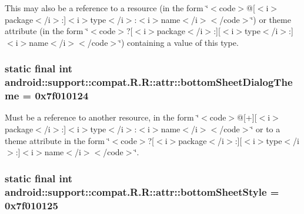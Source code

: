 This may also be a reference to a resource (in the form \char`\"{}$<$code$>$@\mbox{[}$<$i$>$package$<$/i$>$:\mbox{]}$<$i$>$type$<$/i$>$:$<$i$>$name$<$/i$>$$<$/code$>$\char`\"{}) or theme attribute (in the form \char`\"{}$<$code$>$?\mbox{[}$<$i$>$package$<$/i$>$:\mbox{]}\mbox{[}$<$i$>$type$<$/i$>$:\mbox{]}$<$i$>$name$<$/i$>$$<$/code$>$\char`\"{}) containing a value of this type. \hypertarget{classandroid_1_1support_1_1compat_1_1_r_1_1attr_8034aae0aadacf5d1f746a7eb33e7a3c}{
\subsubsection[{bottomSheetDialogTheme}]{\setlength{\rightskip}{0pt plus 5cm}static final int android::support::compat.R.R::attr::bottomSheetDialogTheme = 0x7f010124}}
\label{classandroid_1_1support_1_1compat_1_1_r_1_1attr_8034aae0aadacf5d1f746a7eb33e7a3c}


Must be a reference to another resource, in the form \char`\"{}$<$code$>$@\mbox{[}+\mbox{]}\mbox{[}$<$i$>$package$<$/i$>$:\mbox{]}$<$i$>$type$<$/i$>$:$<$i$>$name$<$/i$>$$<$/code$>$\char`\"{} or to a theme attribute in the form \char`\"{}$<$code$>$?\mbox{[}$<$i$>$package$<$/i$>$:\mbox{]}\mbox{[}$<$i$>$type$<$/i$>$:\mbox{]}$<$i$>$name$<$/i$>$$<$/code$>$\char`\"{}. \hypertarget{classandroid_1_1support_1_1compat_1_1_r_1_1attr_1f751f9457292567569fe06c20344cc5}{
\subsubsection[{bottomSheetStyle}]{\setlength{\rightskip}{0pt plus 5cm}static final int android::support::compat.R.R::attr::bottomSheetStyle = 0x7f010125}}
\label{classandroid_1_1support_1_1compat_1_1_r_1_1attr_1f751f9457292567569fe06c20344cc5}


